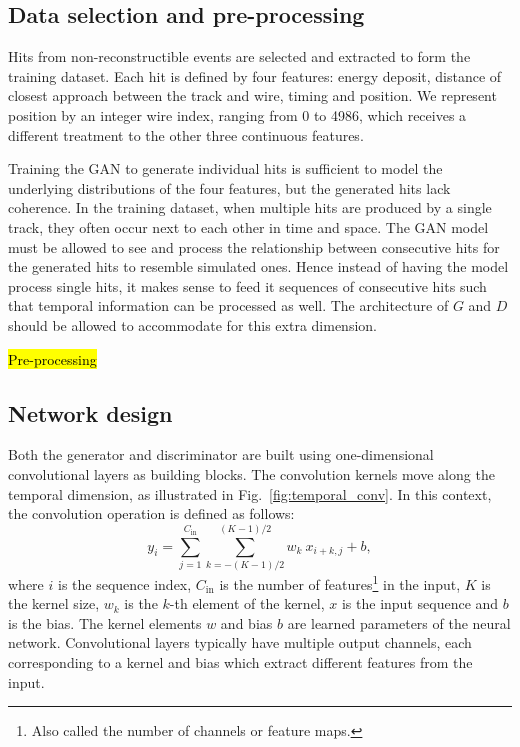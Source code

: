 

\subsection{Data selection and pre-processing}

Hits from non-reconstructible events are selected and extracted to form the training dataset. Each hit is defined by four features: energy deposit, distance of closest approach between the track and wire, timing and position. We represent position by an integer wire index, ranging from 0 to 4986, which receives a different treatment to the other three continuous features.

Training the GAN to generate individual hits is sufficient to model the underlying distributions of the four features, but the generated hits lack coherence. In the training dataset, when multiple hits are produced by a single track, they often occur next to each other in time and space. The GAN model must be allowed to see and process the relationship between consecutive hits for the generated hits to resemble simulated ones. Hence instead of having the model process single hits, it makes sense to feed it sequences of consecutive hits such that temporal information can be processed as well. The architecture of $G$ and $D$ should be allowed to accommodate for this extra dimension.

\hl{Pre-processing}




\subsection{Network design}
Both the generator and discriminator are built using one-dimensional convolutional layers as building blocks.
The convolution kernels move along the temporal dimension, as illustrated in Fig.~\ref{fig:temporal_conv}. 
In this context, the convolution operation is defined as follows:
\begin{equation}
    y_{i} = \sum_{j=1}^{C_\mathrm{in}} \sum_{k=-(K-1)/2}^{(K-1)/2} w_k\ x_{i+k,j} + b,
\end{equation}
where $i$ is the sequence index, $C_\mathrm{in}$ is the number of features\footnote{Also called the number of channels or feature maps.} in the input, $K$ is the kernel size, $w_k$ is the $k$-th element of the kernel, $x$ is the input sequence and $b$ is the bias. The kernel elements $w$ and bias $b$ are learned parameters of the neural network. 
Convolutional layers typically have multiple output channels, each corresponding to a kernel and bias which extract different features from the input.

